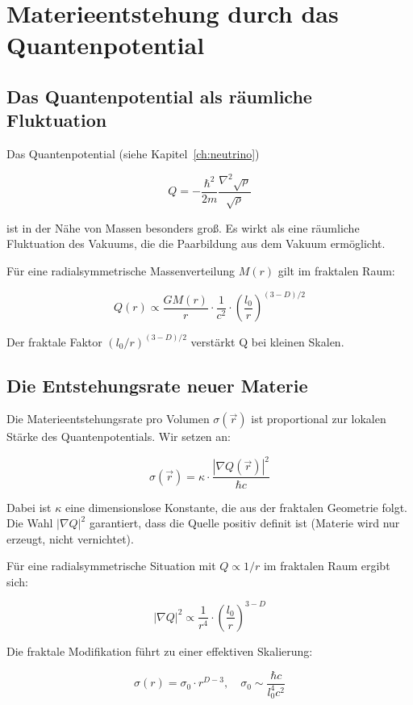 \section{Materieentstehung durch das Quantenpotential}
\label{app:materieentstehung_quantenpotential}

\subsection{Das Quantenpotential als räumliche Fluktuation}
\label{sub:materieentstehung_q_fluktuation}

Das Quantenpotential (siehe Kapitel~\ref{ch:neutrino})

\[
Q = -\frac{\hbar^2}{2m} \frac{\nabla^2 \sqrt{\rho}}{\sqrt{\rho}}
\]

ist in der Nähe von Massen besonders groß. Es wirkt als eine räumliche Fluktuation des Vakuums, die die Paarbildung aus dem Vakuum ermöglicht.

Für eine radialsymmetrische Massenverteilung \( M(r) \) gilt im fraktalen Raum:

\[
Q(r) \propto \frac{GM(r)}{r} \cdot \frac{1}{c^2} \cdot \left( \frac{l_0}{r} \right)^{(3-D)/2}
\]

Der fraktale Faktor \( (l_0/r)^{(3-D)/2} \) verstärkt Q bei kleinen Skalen.

\subsection{Die Entstehungsrate neuer Materie}
\label{sub:materieentstehung_rate}

Die Materieentstehungsrate pro Volumen \( \sigma(\vec{r}) \) ist proportional zur lokalen Stärke des Quantenpotentials. Wir setzen an:

\[
\sigma(\vec{r}) = \kappa \cdot \frac{|\nabla Q(\vec{r})|^2}{\hbar c}
\]

Dabei ist \( \kappa \) eine dimensionslose Konstante, die aus der fraktalen Geometrie folgt. Die Wahl \( |\nabla Q|^2 \) garantiert, dass die Quelle positiv definit ist (Materie wird nur erzeugt, nicht vernichtet).

Für eine radialsymmetrische Situation mit \( Q \propto 1/r \) im fraktalen Raum ergibt sich:

\[
|\nabla Q|^2 \propto \frac{1}{r^4} \cdot \left( \frac{l_0}{r} \right)^{3-D}
\]

Die fraktale Modifikation führt zu einer effektiven Skalierung:

\[
\boxed{\sigma(r) = \sigma_0 \cdot r^{D-3}}, \quad \sigma_0 \sim \frac{\hbar c}{l_0^4 c^2}
\]

